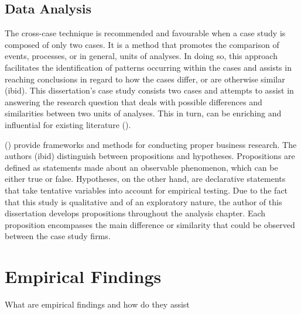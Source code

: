 \documentclass[11pt,a4paper]{article}
\begin{document}
{{\subsection{Data Analysis}
\vspace{-1mm}
 \par
The cross-case technique is recommended and favourable when a case study is composed of only two cases. It is a method that promotes the comparison of events, processes, or in general, units of analyses. In doing so, this approach facilitates the identification of patterns occurring within the cases and assists in reaching conclusions in regard to how the cases differ, or are otherwise similar (ibid). This dissertation's case study consists two cases and attempts to assist in answering the research question that deals with possible differences and similarities between two units of analyses. This in turn, can be enriching and influential for existing literature (\cite{gustafssonSingleCaseStudies2017}). \par

\citeauthor{cooperBusinessResearchMethods2014} (\citeyear{cooperBusinessResearchMethods2014}) provide frameworks and methods for conducting proper business research. The authors (ibid) distinguish between propositions and hypotheses. Propositions are defined as statements made about an observable phenomenon, which can be either true or false. Hypotheses, on the other hand, are declarative statements that take tentative variables into account for empirical testing. Due to the fact that this study is qualitative and of an exploratory nature, the author of this dissertation develops propositions throughout the analysis chapter. Each proposition encompasses the main difference or similarity that could be observed between the case study firms. 


\section{Empirical Findings}
\label{emp_findings}
What are empirical findings and how do they assist
}}
\end{document}
